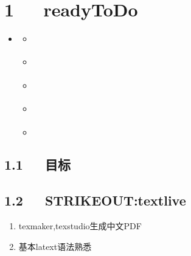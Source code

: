 \documentclass[letterpaper,12pt,english]{sphinxmanual}
\begin{document}
\chapter{1   readyToDo}
\label{\detokenize{002plan/readyToDo:readytodo}}\label{\detokenize{002plan/readyToDo::doc}}
\begin{sphinxShadowBox}
\begin{itemize}
\item {} 
\label{\detokenize{002plan/readyToDo:id3}}{\hyperref[\detokenize{002plan/readyToDo:readytodo}]{}}
\begin{itemize}
\item {} 
\label{\detokenize{002plan/readyToDo:id4}}{\hyperref[\detokenize{002plan/readyToDo:id2}]{}}

\item {} 
\label{\detokenize{002plan/readyToDo:id5}}{\hyperref[\detokenize{002plan/readyToDo:strikeout-textlive}]{}}

\item {} 
\label{\detokenize{002plan/readyToDo:id6}}{\hyperref[\detokenize{002plan/readyToDo:pandoc}]{}}

\item {} 
\label{\detokenize{002plan/readyToDo:id7}}{\hyperref[\detokenize{002plan/readyToDo:siphinx}]{}}

\item {} 
\label{\detokenize{002plan/readyToDo:id8}}{\hyperref[\detokenize{002plan/readyToDo:rstudio}]{}}

\end{itemize}

\end{itemize}
\end{sphinxShadowBox}


\section{1.1   目标}
\label{\detokenize{002plan/readyToDo:id2}}

\section{1.2   STRIKEOUT:textlive}
\label{\detokenize{002plan/readyToDo:strikeout-textlive}}\begin{enumerate}
%
\item {} 
texmaker,texstudio生成中文PDF

\item {} 
基本latext语法熟悉

\end{enumerate}
\end{document}
